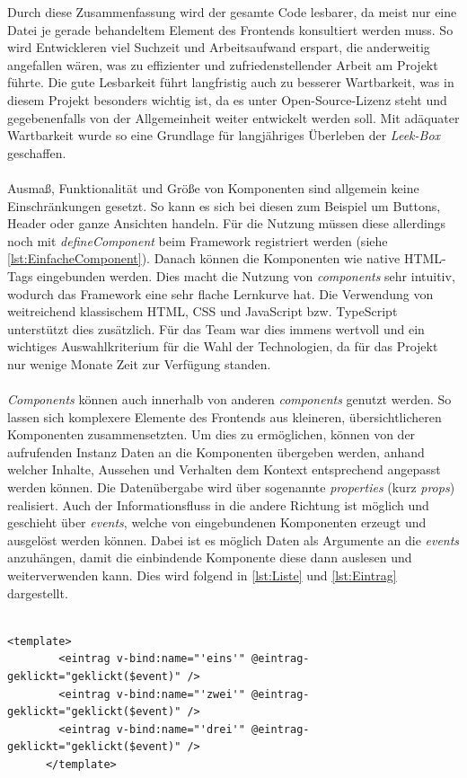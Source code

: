\documentclass[10pt, a4paper]{article}
\begin{document}
\begin{onehalfspace}
  Durch diese Zusammenfassung wird der gesamte Code lesbarer,
  da meist nur eine Datei je gerade behandeltem Element des Frontends konsultiert werden muss.
  So wird Entwickleren viel Suchzeit und Arbeitsaufwand erspart, die anderweitig angefallen wären, was zu effizienter und zufriedenstellender Arbeit am Projekt führte.
  Die gute Lesbarkeit führt langfristig auch zu besserer Wartbarkeit, was in diesem Projekt besonders wichtig ist,
  da es unter Open-Source-Lizenz steht und gegebenenfalls von der Allgemeinheit weiter entwickelt werden soll.
  Mit adäquater Wartbarkeit wurde so eine Grundlage für langjähriges Überleben der \textit{Leek-Box} geschaffen.
  \\~\\
  Ausmaß, Funktionalität und Größe von Komponenten sind allgemein keine Einschränkungen gesetzt.
  So kann es sich bei diesen zum Beispiel um Buttons, Header oder ganze Ansichten handeln.
  Für die Nutzung müssen diese allerdings noch mit \textit{defineComponent} beim Framework registriert werden
  (siehe \autoref{lst:EinfacheComponent}).
  Danach können die Komponenten wie native HTML-Tags eingebunden werden.
  Dies macht die Nutzung von \textit{components} sehr intuitiv, wodurch das Framework eine sehr flache Lernkurve hat.
  Die Verwendung von weitreichend klassischem HTML, CSS und JavaScript bzw. TypeScript unterstützt dies zusätzlich.
  Für das Team war dies immens wertvoll und ein wichtiges Auswahlkriterium für die Wahl der Technologien,
  da für das Projekt nur wenige Monate Zeit zur Verfügung standen.
  \\~\\
  \textit{Components} können auch innerhalb von anderen \textit{components} genutzt werden.
  So lassen sich komplexere Elemente des Frontends aus kleineren, übersichtlicheren Komponenten zusammensetzten.
  Um dies zu ermöglichen, können von der aufrufenden Instanz Daten an die Komponenten übergeben werden,
    anhand welcher Inhalte, Aussehen und Verhalten dem Kontext entsprechend angepasst werden können.
  Die Datenübergabe wird über sogenannte \textit{properties} (kurz \textit{props}) realisiert.
  Auch der Informationsfluss in die andere Richtung ist möglich und geschieht über \textit{events}, welche von eingebundenen Komponenten erzeugt und ausgelöst werden können.
  Dabei ist es möglich Daten als Argumente an die \textit{events} anzuhängen, damit die einbindende Komponente diese dann auslesen und weiterverwenden kann.
  Dies wird folgend in \autoref{lst:Liste} und \autoref{lst:Eintrag} dargestellt.
  \\~\\
  \begin{minipage}{\textwidth}
    \begin{lstlisting}[caption={beispielhafte Listen-Komponente (Liste.vue)}, captionpos=b, label=lst:Liste]
      <template>
        <eintrag v-bind:name="'eins'" @eintrag-geklickt="geklickt($event)" />
        <eintrag v-bind:name="'zwei'" @eintrag-geklickt="geklickt($event)" />
        <eintrag v-bind:name="'drei'" @eintrag-geklickt="geklickt($event)" />
      </template>


\end{lstlisting}
\end{minipage}
\end{onehalfspace}
\end{document}
